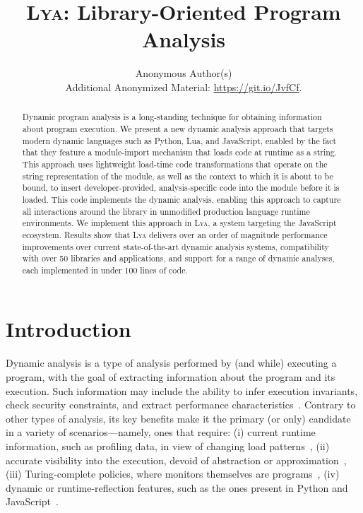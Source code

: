 \documentclass[letterpaper,twocolumn,10pt]{article}
\newcommand{\sys}{{\scshape Lya}\xspace}
\begin{document}

\date{}

\title{\Large \bf \sys: Library-Oriented Program Analysis}

\author{
{\rm Anonymous Author(s)}\\
\normalsize{Additional Anonymized Material: \href{https://git.io/JvfCf}{https://git.io/JvfCf}.}
}

\maketitle

\begin{abstract}

Dynamic program analysis is a long-standing technique for obtaining information about program execution.
We present a new dynamic analysis approach that targets modern dynamic languages such as Python, Lua, and JavaScript, enabled by the fact that they feature a module-import mechanism that loads code at runtime as a string.
This approach uses lightweight load-time code transformations that operate on the string representation of the module, as well as the context to which it is about to be bound, to insert developer-provided, analysis-specific code into the module before it is loaded.
This code implements the dynamic analysis, enabling this approach to capture all interactions around the library in unmodified production language runtime environments.
We implement this approach in \sys, a system targeting the JavaScript ecosystem. 
Results show that \sys delivers over an order of magnitude performance improvements over current state-of-the-art dynamic analysis systems, compatibility with over 50 libraries and applications, and support for a range of dynamic analyses, each implemented in under 100 lines of code.
\end{abstract}

\section{Introduction}
\label{intro}

Dynamic analysis is a type of analysis performed by (and while) executing a program, with the goal of extracting information about the program and its execution.
Such information may include the ability to infer execution invariants, check security constraints, and extract performance characteristics~\cite{analysis:10}.
Contrary to other types of analysis, its key benefits make it the primary (or only) candidate in a variety of scenarios---namely, ones that require:
  (i) current runtime information, such as profiling data, in view of changing load patterns~\cite{staticdynamic},
  (ii) accurate visibility into the execution, devoid of abstraction or approximation~\cite{staticdynamic},
  (iii) Turing-complete policies, where monitors themselves are programs~\cite{contracts1, contracts2, contracts3},
  (iv) dynamic or runtime-reflection features, such as the ones present in Python and JavaScript~\cite{jsanalysis1, jsanalysis2}.
\end{document}
